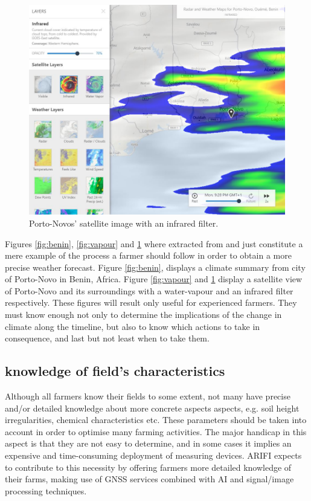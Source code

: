 \begin{figure}[b!]
    \centering
    \includegraphics[scale=0.6]{images/infrared.JPG}
    \caption{Porto-Novos' satellite image with an infrared filter.}
    \label{fig:filter}
\end{figure}
%
%
Figures \ref{fig:benin}, \ref{fig:vapour}  and \ref{fig:filter} where extracted from  and just constitute a mere example of the process a farmer should follow in order to obtain a more precise weather forecast. Figure \ref{fig:benin}, displays a climate summary from city of Porto-Novo in Benin, Africa. Figure \ref{fig:vapour} and \ref{fig:filter} display a satellite view of Porto-Novo and its surroundings with a water-vapour and an infrared filter respectively. These figures will result only useful for experienced farmers. They must know enough not only to determine the implications of the change in climate along the timeline, but also to know which actions to take in consequence, and last but not least when to take them.
%
\clearpage

\subsection{knowledge of field's characteristics}
Although all farmers know their fields to some extent, not many have precise and/or detailed knowledge about more concrete aspects aspects, e.g. soil height irregularities, chemical characteristics etc. These parameters should be taken into account in order to optimise many farming activities. The major handicap in this aspect is that they are not easy to determine, and in some cases it implies an expensive and time-consuming deployment of measuring devices. ARIFI expects to contribute to this necessity by offering farmers more detailed knowledge of their farms, making use of GNSS services combined with AI and signal/image processing techniques.
